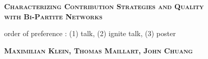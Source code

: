 \documentclass[letterpaper,9pt,a4paper]{article}
\begin{document}
\begin{center}






  

\vspace{-1cm}
{\large {\bf \textsc{Characterizing Contribution Strategies and Quality \\ with Bi-Partite Networks\\}}}
\begin{center}
\vspace{-0.cm}
\footnotesize{order of preference : (1) talk, (2) ignite talk, (3) poster}
\end{center}
\vspace{-0.cm}
{ {\bf \textsc{Maximilian Klein, Thomas Maillart, John Chuang}}}
\vspace{0.2cm}
\end{center}
\end{document}
